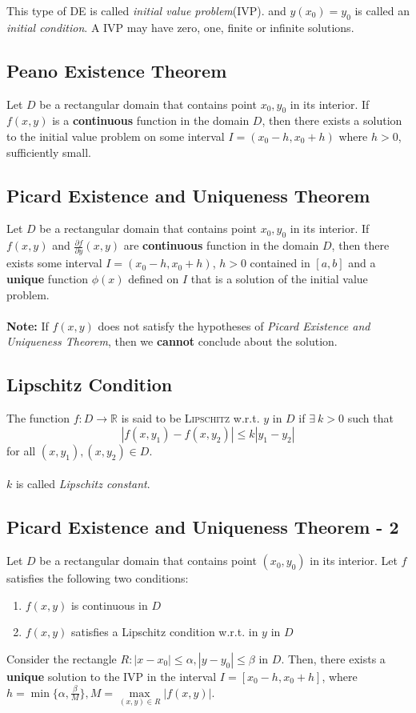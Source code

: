 \documentclass[oneside]{book}
\begin{document}
\noindent This type of DE is called \textit{initial value problem}(IVP). and \(y(x_0) = y_0\) is called an \textit{initial condition}.
A IVP may have zero, one, finite or infinite solutions.

\subsection{Peano Existence Theorem}
\noindent Let \(D\) be a rectangular domain that contains point \(x_0, y_0\) in its interior. If \(f(x, y)\) is a \textbf{continuous} function in the domain \(D\), then there exists a solution to the initial value problem on some interval \(I = (x_0 - h, x_0 + h)\) where \(h>0\), sufficiently small.

\subsection{Picard Existence and Uniqueness Theorem}
\noindent Let \(D\) be a rectangular domain that contains point \(x_0, y_0\) in its interior. If \(f(x, y)\) and \(\frac{\partial f}{\partial y}(x, y)\) are \textbf{continuous} function in the domain \(D\), then there exists some interval \(I = (x_0 - h, x_0 + h)\), \(h>0\) contained in \([a, b]\) and a \textbf{unique} function \(\phi(x)\) defined on \(I\) that is a solution of the initial value problem.
\\\\
\noindent\textbf{Note:} If \(f(x, y)\) does not satisfy the hypotheses of \textit{Picard Existence and Uniqueness Theorem}, then we \textbf{cannot} conclude about the solution.

\subsection{Lipschitz Condition}
\noindent The function \(f: D\to\mathbb{R}\) is said to be \textsc{Lipschitz} w.r.t. \(y\) in \(D\) if \(\exists\ k>0\) such that
\[
	|f(x, y_1) - f(x, y_2)| \leq k|y_1 - y_2|
\]
for all \((x, y_1), (x, y_2) \in D\).
\\\\
\noindent \(k\) is called \textit{Lipschitz constant}.

\subsection{Picard Existence and Uniqueness Theorem - 2}
Let \(D\) be a rectangular domain that contains point \((x_0, y_0)\) in its interior. Let \(f\) satisfies the following two conditions:
\begin{enumerate}
	\item \(f(x, y)\) is continuous in \(D\)
	\item \(f(x, y)\) satisfies a Lipschitz condition w.r.t. in \(y\) in \(D\)
\end{enumerate}
Consider the rectangle \(R: |x - x_0| \leq \alpha, |y- y_0|\leq \beta\) in \(D\). Then, there exists a \textbf{unique} solution to the IVP in the interval \(I = [x_0 - h, x_0 + h]\), where \(h = \min\{\alpha, \frac{\beta}{M}\}, M = \max\limits_{(x, y)\in{R}}|f(x, y)|\).




\end{document}
